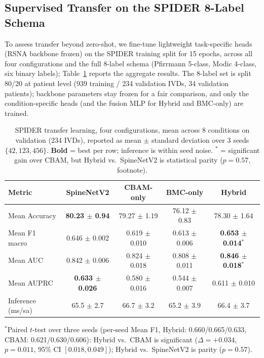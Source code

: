 \documentclass[runningheads]{llncs}
\newcommand{\best}[1]{\textcolor{best}{\textbf{#1}}}
\begin{document}
\subsection{Supervised Transfer on the SPIDER 8-Label Schema}
\label{sec:spider_transfer}

To assess transfer beyond zero-shot, we fine-tune lightweight task-specific heads (RSNA backbone frozen) on the SPIDER training split for 15 epochs, across all four configurations and the full 8-label schema (Pfirrmann 5-class, Modic 4-class, six binary labels); Table~\ref{tab:spider_transfer_agg} reports the aggregate results. The 8-label set is split 80/20 at patient level (939 training / 234 validation IVDs, 34 validation patients); backbone parameters stay frozen for a fair comparison, and only the condition-specific heads (and the fusion MLP for Hybrid and BMC-only) are trained.

\begin{table}[t]
\centering
\caption{SPIDER transfer learning, four configurations, mean across 8 conditions on validation (234 IVDs), reported as mean $\pm$ standard deviation over 3 seeds $\{42, 123, 456\}$. \textbf{Bold} = best per row; inference is within seed noise. $^\ast$ = significant gain over CBAM, but Hybrid vs.\ SpineNetV2 is statistical parity ($p=0.57$, footnote).}
\label{tab:spider_transfer_agg}
\footnotesize
\begin{tabular}{@{}lcccc@{}}
\toprule
Metric & SpineNetV2 & CBAM-only & BMC-only & Hybrid \\
\midrule
Mean Accuracy & \best{80.23 $\pm$ 0.94} & 79.27 $\pm$ 1.19 & 76.12 $\pm$ 0.83 & 78.30 $\pm$ 1.64 \\
Mean F1 macro & 0.646 $\pm$ 0.002 & 0.619 $\pm$ 0.010 & 0.613 $\pm$ 0.006 & \best{0.653 $\pm$ 0.014}$^\ast$ \\
Mean AUC      & 0.842 $\pm$ 0.006 & 0.824 $\pm$ 0.018 & 0.808 $\pm$ 0.011 & \best{0.846 $\pm$ 0.018}$^\ast$ \\
Mean AUPRC    & \best{0.633 $\pm$ 0.026} & 0.580 $\pm$ 0.016 & 0.544 $\pm$ 0.007 & 0.611 $\pm$ 0.010 \\
\midrule
Inference (ms/sa) & 65.5 $\pm$ 2.7 & 66.7 $\pm$ 3.2 & 65.2 $\pm$ 3.9 & 66.4 $\pm$ 3.7 \\
\bottomrule
\end{tabular}

\vspace{2pt}
{\raggedright\scriptsize
$^\ast$Paired $t$-test over three seeds (per-seed Mean F1, Hybrid: 0.660/0.665/0.633, CBAM: 0.621/0.630/0.606): Hybrid vs.\ CBAM is significant ($\Delta=+0.034$, $p=0.011$, 95\% CI $[0.018,0.049]$); Hybrid vs.\ SpineNetV2 is parity ($p=0.57$).\par}
\end{table}
\end{document}
